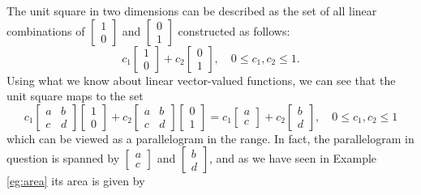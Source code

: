 \documentclass[../book.tex]{subfiles}
\begin{document}
The unit square in two dimensions can be described as the set of all linear combinations of \(\begin{bmatrix}1\\ 0\end{bmatrix}\) and \(\begin{bmatrix}0\\ 1\end{bmatrix}\) constructed as follows:
\begin{equation}\label{eq:vec-39}
c_1  
\begin{bmatrix}
  1 \\ 0
\end{bmatrix}
+ 
c_2
\begin{bmatrix}
  0 \\ 1
\end{bmatrix},
\quad
0 \leq c_1,c_2 \leq 1.
\end{equation}
Using what we know about linear vector-valued functions, we can see that the unit square maps to the set
\begin{equation}\label{eq:vec-40}
c_1 	
\begin{bmatrix}
  a & b \\
  c & d
\end{bmatrix} 
\begin{bmatrix}
  1 \\ 0	
\end{bmatrix}
+
c_2 
\begin{bmatrix}
  a & b \\
  c & d
\end{bmatrix}
\begin{bmatrix}
  0 \\ 1
\end{bmatrix}
=
c_1 
\begin{bmatrix}
  a \\ c	
\end{bmatrix}
+
c_2 
\begin{bmatrix}
  b \\ d
\end{bmatrix},
\quad
0 \leq c_1,c_2 \leq 1
\end{equation}
which can be viewed as a parallelogram in the range. In fact, the parallelogram in question is spanned by \(\begin{bmatrix} a \\ c\end{bmatrix}\) and \(\begin{bmatrix} b \\ d\end{bmatrix}\), and as we have seen in Example \ref{eg:area} its area is given by
\end{document}
